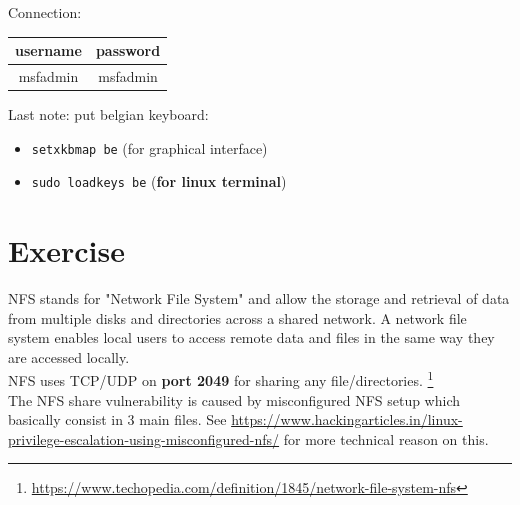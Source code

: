 \documentclass{article}
\begin{document}
\noindent Connection:
\begin{table}[h!]
\centering
\label{tab:my-table}
\begin{tabular}{c|c}
\textbf{username} & \textbf{password} \\ \hline
msfadmin          & msfadmin         
\end{tabular}
\end{table}

\noindent Last note: put belgian keyboard:
\begin{itemize}
    \item \lstinline{setxkbmap be} (for graphical interface)
    \item \lstinline{sudo loadkeys be} (\textbf{for linux terminal})
\end{itemize}

\section{Exercise}

NFS stands for "Network File System" and allow the storage and retrieval of data from multiple disks and directories across a shared network. A network file system enables local users to access remote data and files in the same way they are accessed locally. \\NFS uses TCP/UDP on \textbf{port 2049} for sharing any file/directories. \footnote{\url{https://www.techopedia.com/definition/1845/network-file-system-nfs}}\\

\noindent The NFS share vulnerability is caused by misconfigured NFS setup which basically consist in 3 main files. See \url{https://www.hackingarticles.in/linux-privilege-escalation-using-misconfigured-nfs/} for more technical reason on this.\\
\end{document}
